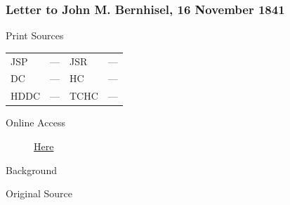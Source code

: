 		\subsubsection{Letter to John M. Bernhisel, 16 November 1841}
			\label{EMS-1841-JS-16-NOV-1841}
				
			\begin{description}
				\item[Print Sources]
			\end{description}	

			\begin{tabular}{p{0.5in}p{1in}p{0.5in}p{1in}}
				JSP	 	& ---		& JSR 		& --- \\
				DC	 	& ---		& HC 		& --- \\
				HDDC 	& ---		& TCHC 		& --- \\
			\end{tabular}
			
			\begin{description}
				\item[Online Access] \href{https://www.josephsmithpapers.org/paper-summary/letter-to-johnm-bernhisel-16november-1841/1}{Here}
			\end{description}
			
			\begin{description}
				\item[Background]
			\end{description}
			
			
			\begin{description}
				\item[Original Source]
			\end{description}
			
			
